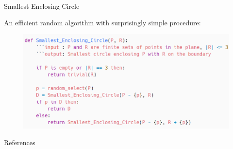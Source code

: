 \documentclass{beamer}
\newcommand{\lf}{\left[}
\newcommand{\rf}{\right]}
\begin{document}
\begin{frame}{Smallest Enclosing Circle}

	An efficient random algorithm with surprisingly simple procedure:

	\begin{figure}[h]
		\includegraphics[width=1.0\linewidth]{pics/smallest_enclosing_circle_psudocode.png}
	\end{figure}







\end{frame}

\begin{frame}[allowframebreaks]{References}
	
\end{frame}
\end{document}
